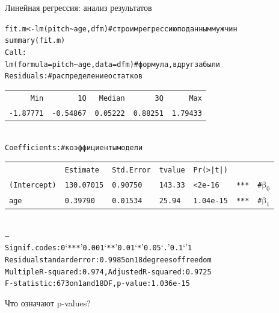 \begin{frame}{Линейная регрессия: анализ результатов}
\scriptsize
\begin{alltt}
fit.m <- \alert{lm(pitch\textasciitilde age, dfm)} \hfill \# cтроим регрессию по данным мужчин\\
\alert{summary(fit.m)}\bigskip\\
Call:\\
lm(formula = pitch \textasciitilde  age, data = dfm)\hfill \# формула, вдруг забыли \bigskip\\
Residuals: \hfill \# распределение остатков\\
\begin{tabular}{rrrrr}
Min & 1Q & Median &3Q & Max \\
-1.87771 & -0.54867 & 0.05222 & 0.88251 & 1.79433 \\
\end{tabular}
\bigskip\\
Coefficients:\hfill \# коэффициенты модели\\
\begin{tabular}{llllllr}
					 	& Estimate		& Std. Error	& t value	&Pr(>|t|)	&  		& \\
(Intercept)		& 130.07015	&   0.90750		&  143.33		&  < 2e-16 	& *** 	& \alert{\# $\mbox{β}_0$}\\
age   				& 0.39790		& 0.01534		& 25.94		& 1.04e-15	&***	&  \alert{\# $\mbox{β}_1$}\\
\end{tabular}
\\
---\\
Signif. codes:  0 ‘***’ 0.001 ‘**’ 0.01 ‘*’ 0.05 ‘.’ 0.1 ‘ ’ 1\medskip\\
Residual standard error: 0.9985 on 18 degrees of freedom\\
Multiple R-squared:  0.974,	\alert{Adjusted R-squared:  0.9725} \\
F-statistic:   673 on 1 and 18 DF,  p-value: 1.036e-15\\
\end{alltt}
\normalsize
\alert{Что означают p-values?}
\end{frame}
